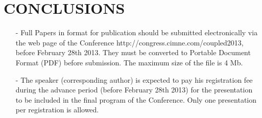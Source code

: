 \section{CONCLUSIONS}

\begin{itemize}
\item[-] Full Papers in format for publication should be submitted electronically via the web page of the Conference http://congress.cimne.com/coupled2013, before February 28th 2013. They must be converted to  Portable Document Format (PDF) before submission. The maximum size of the file is 4 Mb.

\item[-] The speaker (corresponding author) is expected to pay his registration fee during the advance period (before February 28th 2013) for the presentation to be included in the final program of the Conference. Only one presentation per registration is allowed.
\end{itemize}